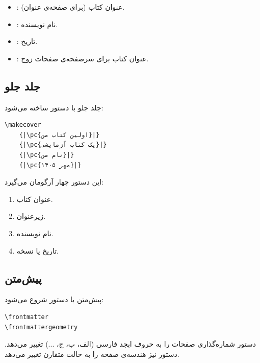 \begin{itemize}
    \item {}: عنوان کتاب (برای صفحه‌ی
    عنوان).
    \item {}: نام نویسنده.
    \item {}: تاریخ.
    \item {}: عنوان کتاب برای
    سرصفحه‌ی صفحات زوج.
\end{itemize}


\subsection{جلد جلو}
\label{sec:first-book-frontcover}

جلد جلو با دستور  ساخته می‌شود:

\begin{latin}
\begin{verbatim}
\makecover
    {|\pc{اولین کتاب من}|}
    {|\pc{یک کتاب آزمایشی}|}
    {|\pc{نام من}|}
    {|\pc{مهر ۱۴۰۵}|}
\end{verbatim}
\end{latin}

این دستور چهار آرگومان می‌گیرد:

\begin{enumerate}
    \item عنوان کتاب.
    \item زیرعنوان.
    \item نام نویسنده.
    \item تاریخ یا نسخه.
\end{enumerate}

\subsection{پیش‌متن}
\label{sec:first-book-frontmatter}

پیش‌متن با دستور  شروع می‌شود:

\begin{latin}
\begin{verbatim}
\frontmatter
\frontmattergeometry
\end{verbatim}
\end{latin}

دستور  شماره‌گذاری صفحات را به
حروف ابجد فارسی (الف، ب، ج، ...) تغییر می‌دهد.
دستور  نیز هندسه‌ی
صفحه را به حالت متقارن تغییر می‌دهد.

